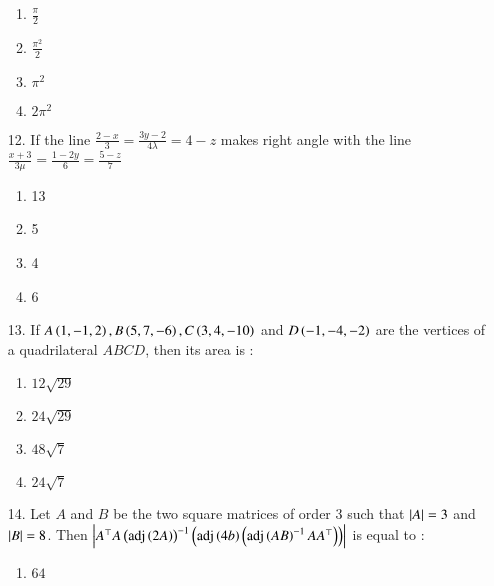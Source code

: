 \documentclass[journal,12pt,onecolumn]{IEEEtran}
\theoremstyle{remark}
\begin{document}
\begin{enumerate}
	\begin{multicols}{4}
		\begin{enumerate}
            \item $\frac{\pi}{2}$ \columnbreak
            \item $\frac{\pi ^ 2}{2}$ \columnbreak
            \item $\pi ^ 2$ \columnbreak
			\item $2\pi ^2 $
		\end{enumerate}
	\end{multicols}
\item[12.] If the line $\frac{2-x}{3} = \frac{3y-2}{4\lambda} = 4-z$ makes right angle with 
    the line $\frac{x+3}{3\mu} = \frac{1-2y}{6} = \frac{5-z}{7}$
		\hfill{}
		\begin{multicols}{4}
		\begin{enumerate}
			\item 13 \columnbreak
			\item 5 \columnbreak 
			\item 4 \columnbreak
			\item 6
		\end{enumerate}
        \end{multicols}
    \item[13.] If $A\left(1, -1, 2\right), B\left(5, 7, -6\right), C\left(3, 4, -10\right)$ and $D\left(-1, -4, -2\right)$ 
        are the vertices of a quadrilateral $ABCD$, then its area is :
		\hfill{\brak{2024-Apr}}
	\begin{multicols}{4}
		\begin{enumerate}
            \item $12\sqrt{29}$ \columnbreak
            \item $24\sqrt{29}$ \columnbreak
            \item $48\sqrt{7}$ \columnbreak
            \item $24\sqrt{7}$
		\end{enumerate}
	\end{multicols}
\item[14.] Let $A$ and $B$ be the two square matrices of order 3 such that $\left\vert A\right\vert = 3$ 
    and $\left\vert B\right\vert = 8$. Then 
    $\left\vert A^{\top}A\left(\textnormal{adj}\left(2A\right)\right)^{-1}\left(\textnormal{adj}\left(4b\right)\left(\textnormal{adj}\left(AB\right)^{-1}AA^{\top}\right)\right)\right\vert$
    is equal to :
		\hfill{}
	\begin{multicols}{4}
		\begin{enumerate}
            \item $64$ \columnbreak

\end{enumerate}
\end{multicols}
\end{enumerate}
\end{document}
